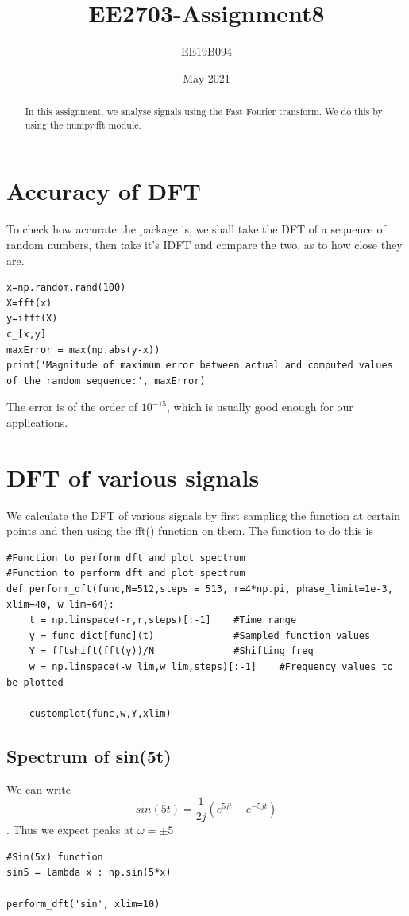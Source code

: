 \documentclass[11pt, a4paper]{article}
\title{EE2703-Assignment8}
\author{EE19B094}
\date{May 2021}
\begin{document}
\maketitle
\newpage
\begin{abstract}
In this assignment, we analyse signals using the Fast Fourier transform. We do this by using the numpy.fft module.
\end{abstract}

\section{Accuracy of DFT}
To check how accurate the package is, we shall take the DFT of a sequence of random numbers, then take it’s IDFT and compare the two, as to how close they are.
\begin{lstlisting}
x=np.random.rand(100)
X=fft(x)
y=ifft(X)
c_[x,y]
maxError = max(np.abs(y-x))
print('Magnitude of maximum error between actual and computed values of the random sequence:', maxError)
\end{lstlisting}
The error is of the order of $10^{-15}$, which is usually good enough for our applications.

\section{DFT of various signals}
We calculate the DFT of various signals by first sampling the function at certain points and then using the fft() function on them. The function to do this is
\begin{lstlisting}
#Function to perform dft and plot spectrum
#Function to perform dft and plot spectrum
def perform_dft(func,N=512,steps = 513, r=4*np.pi, phase_limit=1e-3, xlim=40, w_lim=64):
	t = np.linspace(-r,r,steps)[:-1]	#Time range
	y = func_dict[func](t)				#Sampled function values
	Y = fftshift(fft(y))/N 				#Shifting freq
	w = np.linspace(-w_lim,w_lim,steps)[:-1]	#Frequency values to be plotted

	customplot(func,w,Y,xlim)
\end{lstlisting}
\subsection{Spectrum of sin(5t)}
We can write $$sin(5t) = \frac{1}{2j}(e^{5jt} - e^{-5jt})$$. Thus we expect peaks at $\omega = \pm 5$
\begin{lstlisting}
#Sin(5x) function
sin5 = lambda x : np.sin(5*x)

perform_dft('sin', xlim=10)
\end{lstlisting}
\end{document}
